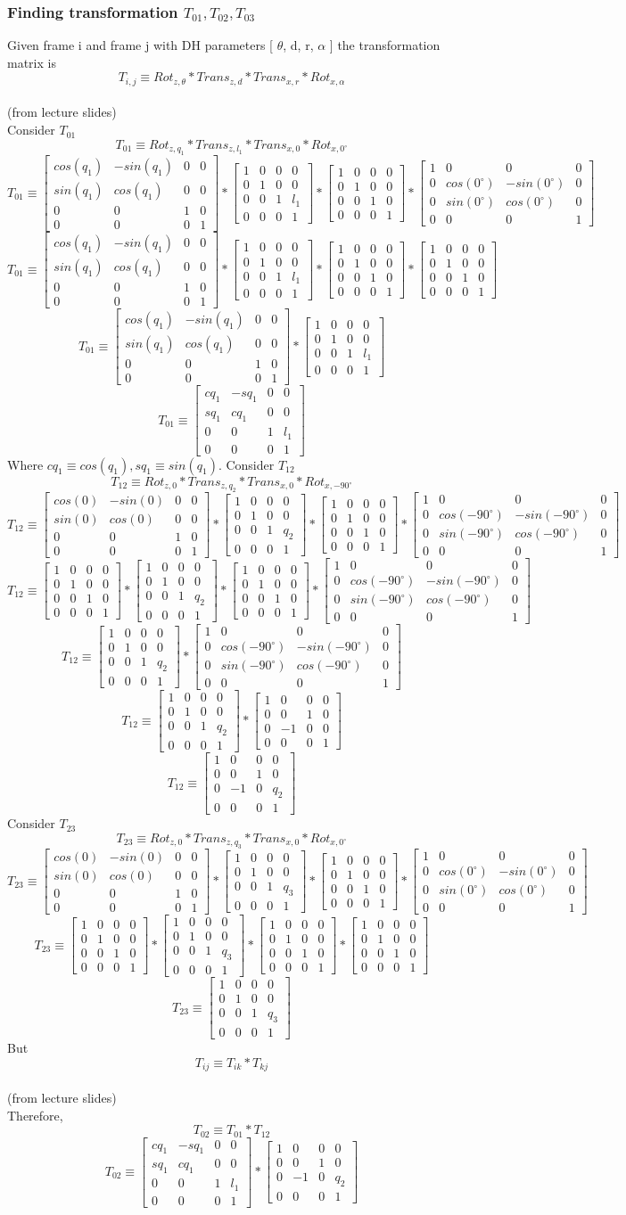 \documentclass[12pt]{article}
\newcommand{\fromlectures}{{\\ \color{blue} \hspace*{\fill}(from lecture slides)} \\}
\newcommand{\rx}[1]{\begin{bmatrix} 1 & 0 & 0 & 0 \\ 0 & cos(#1) & -sin(#1) & 0 \\ 0 & sin(#1) & cos(#1) & 0 \\ 0 & 0 & 0 & 1 \end{bmatrix}}
\newcommand{\rz}[1]{\begin{bmatrix} cos(#1) & -sin(#1) & 0 & 0 \\ sin(#1) & cos(#1) & 0 & 0 \\ 0 & 0 & 1 & 0 \\ 0 & 0 & 0 & 1 \end{bmatrix}}
\newcommand{\iden}{\begin{bmatrix} 1 & 0 & 0 & 0 \\ 0 & 1 & 0 & 0 \\ 0 & 0 & 1 & 0 \\ 0 & 0 & 0 & 1 \end{bmatrix}}
\newcommand{\trans}[3]{\begin{bmatrix} 1 & 0 & 0 & #1 \\ 0 & 1 & 0 & #2 \\ 0 & 0 & 1 & #3 \\ 0 & 0 & 0 & 1 \end{bmatrix}}
\begin{document}
\subsubsection*{Finding transformation $T_{01}, T_{02}, T_{03}$}
Given frame i and frame j with DH parameters [ $\theta$, d, r, $\alpha$ ] the transformation matrix is
\[
  T_{i,j} \equiv Rot_{z,\theta} * Trans_{z, d} * Trans_{x, r} * Rot_{x, \alpha}
\]
\fromlectures
Consider $T_{01}$
\[
  T_{01} \equiv Rot_{z,q_1} * Trans_{z, l_1} * Trans_{x, 0} * Rot_{x, 0^{\circ}}
\]
\[
  T_{01} \equiv \rz{q_1} * \trans{0}{0}{l_1} * \trans{0}{0}{0} * \rx{0^{\circ}}
\]
\[
  T_{01} \equiv \rz{q_1} * \trans{0}{0}{l_1} * \iden * \iden
\]
\[
  T_{01} \equiv \rz{q_1} * \trans{0}{0}{l_1}
\]
\[
  T_{01} \equiv
  \begin{bmatrix}
    cq_1 & -sq_1 & 0 & 0 \\
    sq_1 & cq_1 & 0 & 0 \\
    0 & 0 & 1 & l_1 \\
    0 & 0 & 0 & 1
  \end{bmatrix}
\]
Where $cq_1 \equiv cos(q_1), sq_1 \equiv sin(q_1)$.
Consider $T_{12}$
\[
  T_{12} \equiv Rot_{z, 0} * Trans_{z, q_2} * Trans_{x, 0} * Rot_{x, -90^{\circ}}
\]
\[
  T_{12} \equiv \rz{0} * \trans{0}{0}{q_2} * \trans{0}{0}{0} * \rx{-90^{\circ}}
\]
\[
  T_{12} \equiv \iden * \trans{0}{0}{q_2} * \trans{0}{0}{0} * \rx{-90^{\circ}}
\]
\[
  T_{12} \equiv \trans{0}{0}{q_2} * \rx{-90^{\circ}}
\]
\[
  T_{12} \equiv \trans{0}{0}{q_2}
  *
  \begin{bmatrix}
    1 & 0 & 0 & 0 \\
    0 & 0 & 1 & 0 \\
    0 & -1 & 0 & 0 \\
    0 & 0 & 0 & 1
  \end{bmatrix}
\]
\[
  T_{12} \equiv
  \begin{bmatrix}
    1 & 0 & 0 & 0 \\
    0 & 0 & 1 & 0 \\
    0 & -1 & 0 & q_2 \\
    0 & 0 & 0 & 1
  \end{bmatrix}
\]
Consider $T_{23}$
\[
  T_{23} \equiv Rot_{z, 0} * Trans_{z, q_3} * Trans_{x, 0} * Rot_{x, 0^{\circ}}
\]
\[
  T_{23} \equiv \rz{0} * \trans{0}{0}{q_3} * \trans{0}{0}{0} * \rx{0^{\circ}}
\]
\[
  T_{23} \equiv \iden * \trans{0}{0}{q_3} * \trans{0}{0}{0} * \iden
\]
\[
  T_{23} \equiv \trans{0}{0}{q_3}
\]
But
\[
  T_{ij} \equiv T_{ik} * T_{kj}
\]
\fromlectures
Therefore,
\[
  T_{02} \equiv T_{01} * T_{12}
\]
\[
  T_{02} \equiv
  \begin{bmatrix}
    cq_1 & -sq_1 & 0 & 0 \\
    sq_1 & cq_1 & 0 & 0 \\
    0 & 0 & 1 & l_1 \\
    0 & 0 & 0 & 1
  \end{bmatrix}
  *
  \begin{bmatrix}
    1 & 0 & 0 & 0 \\
    0 & 0 & 1 & 0 \\
    0 & -1 & 0 & q_2 \\
    0 & 0 & 0 & 1
  \end{bmatrix}
\]
\end{document}
